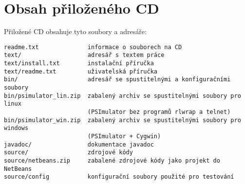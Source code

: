 \documentclass[11pt,twoside,a4paper]{book}
\begin{document}


\chapter{Obsah přiloženého CD}


Přiložené CD obsahuje tyto soubory a adresáře:

\begin{verbatim}
readme.txt              informace o souborech na CD
text/                   adresář s textem práce
text/install.txt        instalační příručka
text/readme.txt         uživatelská příručka
bin/                    adresář se spustitelnými a konfiguračními soubory
bin/psimulator_lin.zip  zabalený archiv se spustitelnými soubory pro linux
                        (PSImulator bez programů rlwrap a telnet)
bin/psimulator_win.zip  zabalený archiv se spustitelnými soubory pro windows
                        (PSImulator + Cygwin)
javadoc/                dokumentace javadoc
source/                 zdrojové kódy
source/netbeans.zip     zabalené zdrojové kódy jako projekt do NetBeans
source/config           konfigurační soubory použité pro testování
\end{verbatim} 


% 
% 
% 
% 
\end{document}
